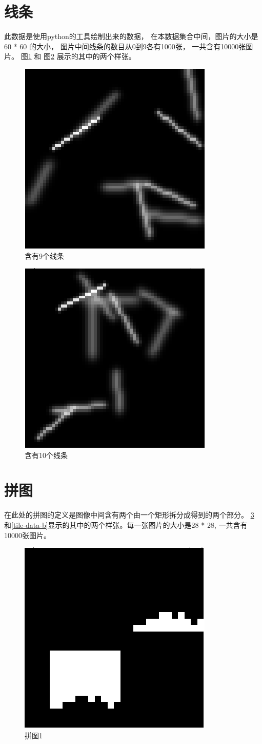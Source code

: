 \section{线条}
此数据是使用python的工具绘制出来的数据， 在本数据集合中间，图片的大小是60 * 60
的大小， 图片中间线条的数目从0到9各有1000张， 一共含有10000张图片。
图\ref{line-data-1} 和 图\ref{line-data-2} 展示的其中的两个样张。
\begin{figure}[!hbt]
    \centering
    \includegraphics[width=0.3\linewidth]{pic/line-data-a.png}
    \caption{含有9个线条}
    \label{line-data-1}
\end{figure}

\begin{figure}[!hbt]
    \centering
    \includegraphics[width=0.3\linewidth]{pic/line-data-b.png}
    \caption{含有10个线条}
    \label{line-data-2}
\end{figure}

\section{拼图}
在此处的拼图的定义是图像中间含有两个由一个矩形拆分成得到的两个部分。
\ref{tile-data-a} 和\ref{tile-data-b}显示的其中的两个样张。每一张图片的大小是28
* 28, 一共含有10000张图片。
\begin{figure}[!hbt]
    \centering
    \includegraphics[width=0.3\linewidth]{pic/tile-data-a.png}
    \caption{拼图1}
    \label{tile-data-a}
\end{figure}

